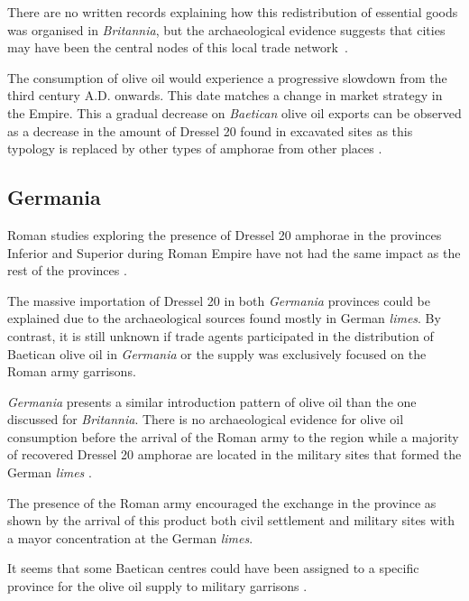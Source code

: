 \documentclass[review]{elsarticle}
\begin{document}
There are no written records explaining how this redistribution of essential goods was organised in \textit{Britannia}, but the archaeological evidence suggests that cities may have been the central nodes of this local trade network~\citep[45]{funari_economic_2005}.

The consumption of olive oil would experience a progressive slowdown from the third century A.D. onwards. This date matches a change in market strategy in the Empire. This a gradual decrease on \textit{Baetican} olive oil exports can be observed as a decrease in the amount of Dressel 20 found in excavated sites as this typology is replaced by other types of amphorae from other places \citep{rodriguez1991aceite,millet_anforas_1998}.


\subsection{Germania}

Roman studies exploring the presence of Dressel 20 amphorae in the provinces Inferior and Superior during Roman Empire have not had the same impact as the rest of the provinces \citep[293]{remesal_baetica_2002}.

The massive importation of Dressel 20 in both \textit{Germania} provinces could be explained due to the archaeological sources found mostly in German \textit{limes}. 
By contrast, it is still unknown if trade agents participated in the distribution of Baetican olive oil in \textit{Germania} or the supply was exclusively focused on the Roman army garrisons\citep[156]{remesal_germn_2010}.


\textit{Germania} presents a similar introduction pattern of olive oil than the one discussed for \textit{Britannia}. There is no archaeological evidence for olive oil consumption before the arrival of the Roman army to the region while a majority of recovered Dressel 20 amphorae are located in the military sites that formed the German \textit{limes} \citep{remesal_germaniaengl_2002}.

The presence of the Roman army encouraged the exchange in the province as shown by the arrival of this product both civil settlement and military sites with a mayor concentration at the German \textit{limes}.

It seems that some Baetican centres could have been assigned to a specific province for the olive oil supply to military garrisons \citep[125]{remesal_concierto}. 
\end{document}
